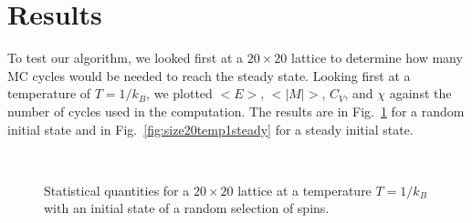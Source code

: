 \documentclass[12pt]{article}
\numberwithin{equation}{section}
\begin{document}
\section{Results}
\label{sec:results}

To test our algorithm, we looked first at a $20\times20$ lattice to determine how many MC cycles would be needed to reach the steady state.  Looking first at a temperature of $T=1/k_{B}$, we plotted $<E>$, $<|M|>$, $C_{V}$, and $\chi$ against the number of cycles used in the computation.  The results are in Fig.~\ref{fig:size20temp1rando} for a random initial state and in Fig.~\ref{fig:size20temp1steady} for a steady initial state. 

\begin{figure}[h]
\begin{center}
 \\
\caption{Statistical quantities for a $20\times20$ lattice at a temperature $T=1/k_{B}$ with an initial state of a random selection of spins.}
\label{fig:size20temp1rando}
\end{center}
\end{figure}
\end{document}
